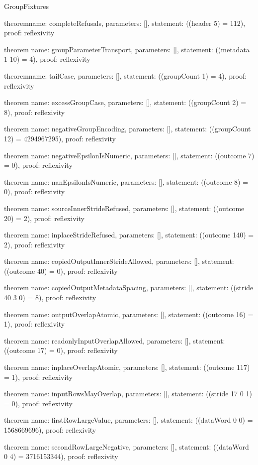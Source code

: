 \begin{lexlean}{GroupFixtures}
\begin{semanticmodule}
theorem{name: completeRefusals, parameters: [], statement: ((header 5) = 112), proof: reflexivity{}}

theorem{
  name: groupParameterTransport,
  parameters: [],
  statement: ((metadata 1 10) = 4),
  proof: reflexivity{}
}

theorem{name: tailCase, parameters: [], statement: ((groupCount 1) = 4), proof: reflexivity{}}

theorem{
  name: excessGroupCase,
  parameters: [],
  statement: ((groupCount 2) = 8),
  proof: reflexivity{}
}

theorem{
  name: negativeGroupEncoding,
  parameters: [],
  statement: ((groupCount 12) = 4294967295),
  proof: reflexivity{}
}

theorem{
  name: negativeEpsilonIsNumeric,
  parameters: [],
  statement: ((outcome 7) = 0),
  proof: reflexivity{}
}

theorem{
  name: nanEpsilonIsNumeric,
  parameters: [],
  statement: ((outcome 8) = 0),
  proof: reflexivity{}
}

theorem{
  name: sourceInnerStrideRefused,
  parameters: [],
  statement: ((outcome 20) = 2),
  proof: reflexivity{}
}

theorem{
  name: inplaceStrideRefused,
  parameters: [],
  statement: ((outcome 140) = 2),
  proof: reflexivity{}
}

theorem{
  name: copiedOutputInnerStrideAllowed,
  parameters: [],
  statement: ((outcome 40) = 0),
  proof: reflexivity{}
}

theorem{
  name: copiedOutputMetadataSpacing,
  parameters: [],
  statement: ((stride 40 3 0) = 8),
  proof: reflexivity{}
}

theorem{
  name: outputOverlapAtomic,
  parameters: [],
  statement: ((outcome 16) = 1),
  proof: reflexivity{}
}

theorem{
  name: readonlyInputOverlapAllowed,
  parameters: [],
  statement: ((outcome 17) = 0),
  proof: reflexivity{}
}

theorem{
  name: inplaceOverlapAtomic,
  parameters: [],
  statement: ((outcome 117) = 1),
  proof: reflexivity{}
}

theorem{
  name: inputRowsMayOverlap,
  parameters: [],
  statement: ((stride 17 0 1) = 0),
  proof: reflexivity{}
}

theorem{
  name: firstRowLargeValue,
  parameters: [],
  statement: ((dataWord 0 0) = 1568669696),
  proof: reflexivity{}
}

theorem{
  name: secondRowLargeNegative,
  parameters: [],
  statement: ((dataWord 0 4) = 3716153344),
  proof: reflexivity{}
}


\end{semanticmodule}
\end{lexlean}
